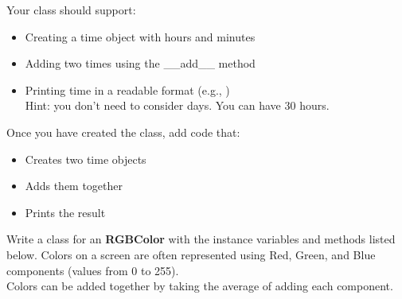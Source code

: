 		Your class should support:
		\begin{itemize}
			\item Creating a time object with hours and minutes
			\item Adding two times using the \_\_add\_\_ method 
			\item Printing time in a readable format (e.g., )\\
				Hint: you don't need to consider days. You can have 30 hours.
		\end{itemize}

		Once you have created the class, add code that:
		\begin{itemize}
			\item Creates two time objects
			\item Adds them together
			\item Prints the result
		\end{itemize}



	\item
		Write a class for an \textbf{RGBColor} with the instance variables and methods listed 
		below. Colors on a screen are often represented using Red, Green, and Blue components 
		(values from 0 to 255).\\
		Colors can be added together by taking the average of adding each component.

